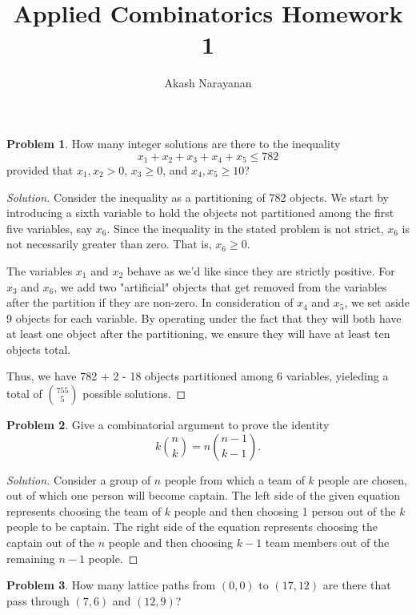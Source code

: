 \documentclass[12pt]{article}
\title{Applied Combinatorics Homework 1}
\author{Akash Narayanan}
\theoremstyle{definition}
\newtheorem{problem-internal}{Problem}[]
\newenvironment{problem}{
  \medskip
  \begin{problem-internal}
}{
\end{problem-internal}
}
\newenvironment{solution}{
  \begin{proof}[Solution]
    \vspace{-8px}
    \setlength{\parskip}{4px}
    \setlength{\parindent}{0px}
}{
\end{proof}
}
\begin{document}
  \maketitle

  \begin{problem}
    How many integer solutions are there to the inequality
    \[ x_1 + x_2 + x_3 + x_4 + x_5 \leq 782 \]
    provided that $x_{1}, x_{2} > 0$, $x_{3} \geq 0$, and $x_{4}, x_{5} \geq 10$?
  \end{problem}

  \begin{solution}
    Consider the inequality as a partitioning of 782 objects. We start by introducing a sixth variable to hold the objects not partitioned among the first five variables, say $x_{6}$. Since the inequality in the stated problem is not strict, $x_{6}$ is not necessarily greater than zero. That is, $x_{6} \geq 0$.

    The variables $x_{1}$ and $x_{2}$ behave as we'd like since they are strictly positive. For $x_{3}$ and $x_{6}$, we add two "artificial" objects that get removed from the variables after the partition if they are non-zero. In consideration of $x_{4}$ and $x_{5}$, we set aside 9 objects for each variable. By operating under the fact that they will both have at least one object after the partitioning, we ensure they will have at least ten objects total.

    Thus, we have 782 + 2 - 18 objects partitioned among 6 variables, yieleding a total of ${755 \choose 5}$ possible solutions.
  \end{solution}

  \begin{problem}
    Give a combinatorial argument to prove the identity
    \[ k {n \choose k} = n {n-1 \choose k-1}. \]
  \end{problem}

  \begin{solution}
    Consider a group of $n$ people from which a team of $k$ people are chosen, out of which one person will become captain. The left side of the given equation represents choosing the team of $k$ people and then choosing 1 person out of the $k$ people to be captain. The right side of the equation represents choosing the captain out of the $n$ people and then choosing $k-1$ team members out of the remaining $n-1$ people. \qedhere
  \end{solution}

  \begin{problem}
    How many lattice paths from $(0, 0)$ to $(17, 12)$ are there that pass through $(7, 6)$ and $(12, 9)$?
  \end{problem}
\end{document}
